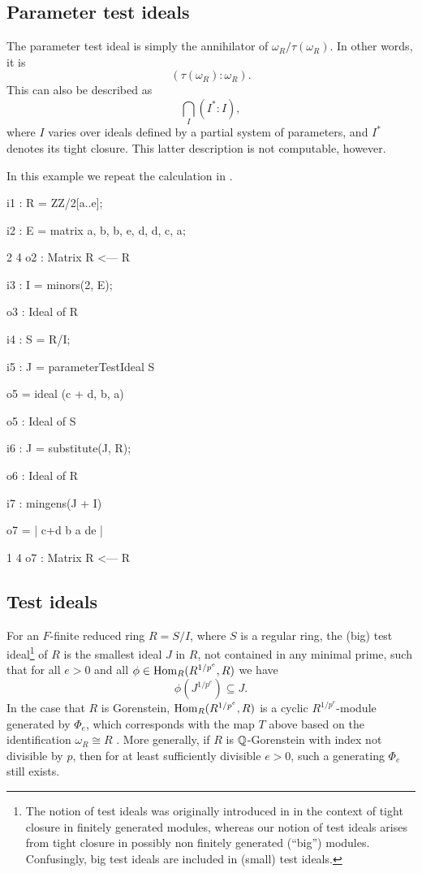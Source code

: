 \documentclass{amsart}
\begin{document}
\subsection{Parameter test ideals}

The parameter test ideal is simply the annihilator of $\omega_R/\tau(\omega_R)$.  In other words, it is
\[
( \tau(\omega_R) : \omega_R ).
\]
This can also be described as
\[
\bigcap_{I} (I^* : I),
\]
where $I$ varies over ideals defined by a partial system of parameters, and $I^*$ denotes its tight closure.  This latter description is not computable, however.

\begin{example}\label{Example: parameter test ideal}
In this example we repeat the calculation in \cite[\S 9]{KatzmanParameterTestIdealOfCMRings}.

\medskip
{\small{}
\begin{MyVerbatim}
i1 : R = ZZ/2[a..e];

i2 : E = matrix {{a, b, b, e}, {d, d, c, a}};

             2       4
o2 : Matrix R  <--- R

i3 : I = minors(2, E);

o3 : Ideal of R

i4 : S = R/I;

i5 : J = parameterTestIdeal S

o5 = ideal (c + d, b, a)

o5 : Ideal of S

i6 : J = substitute(J, R);

o6 : Ideal of R

i7 : mingens(J + I)

o7 = | c+d b a de |

             1       4
o7 : Matrix R  <--- R
\end{MyVerbatim}
}\medskip

\end{example}

\subsection{Test ideals}

For an $F$-finite reduced ring $R = S/I$, where $S$ is a regular ring, the (big) test ideal\footnote{The notion of test ideals was originally introduced in \cite{HochsterHunekeTC1} in the context of tight closure in finitely generated modules, whereas our notion of test ideals arises from
tight closure in possibly non finitely generated (``big'') modules. Confusingly, big test ideals are included in (small) test ideals.}
of $R$ is the smallest ideal $J$ in $R$, not contained in any minimal prime, such that for all $e > 0$ and all $\phi \in \operatorname{Hom}_R(R^{1/p^e}, R)$ we have
\[ \phi(J^{1/p^e}) \subseteq J.\]
In the case that $R$ is Gorenstein,
$\operatorname{Hom}_R(R^{1/p^e}, R)$ is a cyclic $R^{1/p^e}$-module generated by
$\Phi_e$, which corresponds with the map $T$ above based on the identification
$\omega_R \cong R$ \cite{BlickleSchwedeSurveyPMinusE}.  More generally, if $R$ is $\mathbb{Q}$-Gorenstein with index not divisible by $p$, then for at least sufficiently divisible $e > 0$, such a generating $\Phi_e$ still exists.
\end{document}
